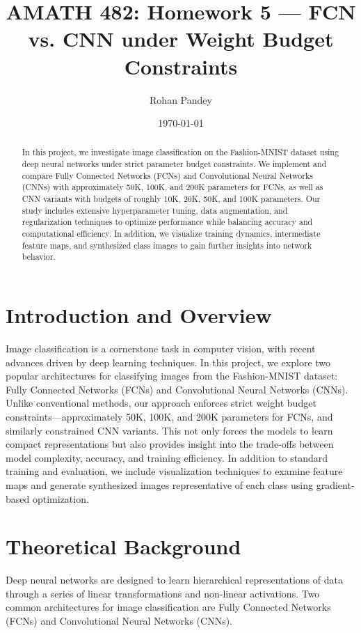\documentclass[11pt]{amsart}
\title{AMATH 482: Homework 5 --- FCN vs. CNN under Weight Budget Constraints}
\author{Rohan Pandey}
\date{\today}
\begin{document}
\begin{abstract}
In this project, we investigate image classification on the Fashion-MNIST dataset using deep neural networks under strict parameter budget constraints. We implement and compare Fully Connected Networks (FCNs) and Convolutional Neural Networks (CNNs) with approximately 50K, 100K, and 200K parameters for FCNs, as well as CNN variants with budgets of roughly 10K, 20K, 50K, and 100K parameters. Our study includes extensive hyperparameter tuning, data augmentation, and regularization techniques to optimize performance while balancing accuracy and computational efficiency. In addition, we visualize training dynamics, intermediate feature maps, and synthesized class images to gain further insights into network behavior.
\end{abstract}

\maketitle

\section{Introduction and Overview}\label{sec:introduction}
Image classification is a cornerstone task in computer vision, with recent advances driven by deep learning techniques. In this project, we explore two popular architectures for classifying images from the Fashion-MNIST dataset: Fully Connected Networks (FCNs) and Convolutional Neural Networks (CNNs). Unlike conventional methods, our approach enforces strict weight budget constraints---approximately 50K, 100K, and 200K parameters for FCNs, and similarly constrained CNN variants. This not only forces the models to learn compact representations but also provides insight into the trade-offs between model complexity, accuracy, and training efficiency. In addition to standard training and evaluation, we include visualization techniques to examine feature maps and generate synthesized images representative of each class using gradient-based optimization.

\section{Theoretical Background}\label{sec:theory}
Deep neural networks are designed to learn hierarchical representations of data through a series of linear transformations and non-linear activations. Two common architectures for image classification are Fully Connected Networks (FCNs) and Convolutional Neural Networks (CNNs).
\end{document}
